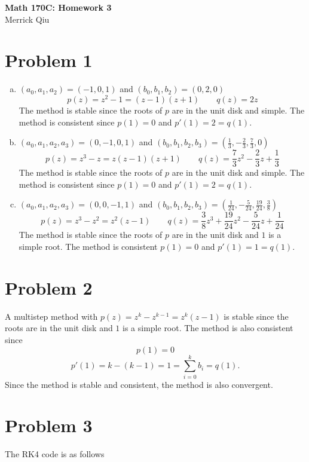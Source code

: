\documentclass{article}
\begin{document}
\begin{center}
	\huge{\bf Math 170C: Homework 3} \\
	Merrick Qiu
\end{center}

\section*{Problem 1}
\begin{enumerate}[(a)]
	\item $(a_0, a_1, a_2) = (-1, 0, 1)$ and $(b_0, b_1, b_2) = (0, 2, 0)$ 
	\[
		p(z) = z^2 - 1 = (z-1)(z+1) \qquad q(z) = 2z 
	\]
	The method is stable since the roots of $p$ are in the unit disk and simple.
	The method is consistent since $p(1)=0$ and $p'(1) = 2 = q(1)$.
	\item $(a_0, a_1, a_2, a_3) = (0, -1, 0, 1)$ and 
	$(b_0, b_1, b_2, b_3) = (\frac{1}{3}, -\frac{2}{3}, \frac{7}{3}, 0)$
	\[
		p(z) = z^3 - z = z(z-1)(z+1) \qquad q(z) = \frac{7}{3}z^2 - \frac{2}{3}z + \frac{1}{3} 
	\]
	The method is stable since the roots of $p$ are in the unit disk and simple.
	The method is consistent since $p(1) = 0$ and $p'(1) = 2 = q(1)$.
	\item  $(a_0, a_1, a_2, a_3) = (0, 0, -1, 1)$ and 
	$(b_0, b_1, b_2, b_3) = (\frac{1}{24}, -\frac{5}{24}, \frac{19}{24}, \frac{3}{8})$
	\[
		p(z) = z^3 - z^2 = z^2(z-1) \qquad q(z) = \frac{3}{8}z^3 + \frac{19}{24}z^2 - \frac{5}{24}z + \frac{1}{24}
	\]
	The method is stable since the roots of $p$ are in the unit disk and $1$ is a simple root.
	The method is consistent $p(1) = 0$ and $p'(1) = 1 = q(1)$.
\end{enumerate}
\newpage 

\section*{Problem 2}
A multistep method with $p(z) = z^k - z^{k-1} = z^k(z-1)$ is stable
since the roots are in the unit disk and $1$ is a simple root.
The method is also consistent since
\[
	p(1) = 0
\]
\[
	p'(1) = k - (k-1) = 1 = \sum_{i=0}^k b_i = q(1).
\]
Since the method is stable and consistent, 
the method is also convergent.
\newpage 

\section*{Problem 3}
The RK4 code is as follows

\end{document}

